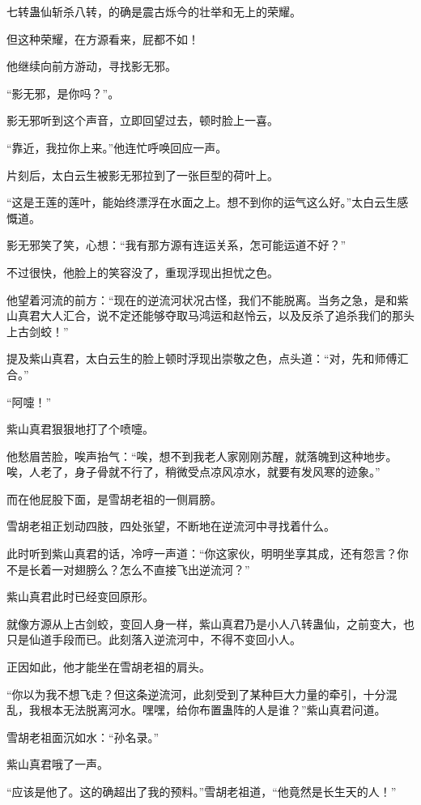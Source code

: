 \begin{this_body}
七转蛊仙斩杀八转，的确是震古烁今的壮举和无上的荣耀。

但这种荣耀，在方源看来，屁都不如！

他继续向前方游动，寻找影无邪。

“影无邪，是你吗？”。

影无邪听到这个声音，立即回望过去，顿时脸上一喜。

“靠近，我拉你上来。”他连忙呼唤回应一声。

片刻后，太白云生被影无邪拉到了一张巨型的荷叶上。

“这是王莲的莲叶，能始终漂浮在水面之上。想不到你的运气这么好。”太白云生感慨道。

影无邪笑了笑，心想：“我有那方源有连运关系，怎可能运道不好？”

不过很快，他脸上的笑容没了，重现浮现出担忧之色。

他望着河流的前方：“现在的逆流河状况古怪，我们不能脱离。当务之急，是和紫山真君大人汇合，说不定还能够夺取马鸿运和赵怜云，以及反杀了追杀我们的那头上古剑蛟！”

提及紫山真君，太白云生的脸上顿时浮现出崇敬之色，点头道：“对，先和师傅汇合。”

“阿嚏！”

紫山真君狠狠地打了个喷嚏。

他愁眉苦脸，唉声抬气：“唉，想不到我老人家刚刚苏醒，就落魄到这种地步。唉，人老了，身子骨就不行了，稍微受点凉风凉水，就要有发风寒的迹象。”

而在他屁股下面，是雪胡老祖的一侧肩膀。

雪胡老祖正划动四肢，四处张望，不断地在逆流河中寻找着什么。

此时听到紫山真君的话，冷哼一声道：“你这家伙，明明坐享其成，还有怨言？你不是长着一对翅膀么？怎么不直接飞出逆流河？”

紫山真君此时已经变回原形。

就像方源从上古剑蛟，变回人身一样，紫山真君乃是小人八转蛊仙，之前变大，也只是仙道手段而已。此刻落入逆流河中，不得不变回小人。

正因如此，他才能坐在雪胡老祖的肩头。

“你以为我不想飞走？但这条逆流河，此刻受到了某种巨大力量的牵引，十分混乱，我根本无法脱离河水。嘿嘿，给你布置蛊阵的人是谁？”紫山真君问道。

雪胡老祖面沉如水：“孙名录。”

紫山真君哦了一声。

“应该是他了。这的确超出了我的预料。”雪胡老祖道，“他竟然是长生天的人！”


\end{this_body}
